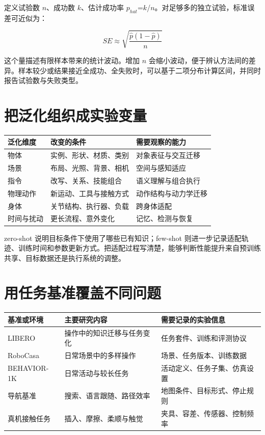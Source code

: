 \documentclass[UTF8,a4paper,11pt,oneside,openany,fontset=none]{ctexbook}
\begin{document}
定义试验数 \(n\)、成功数 \(k\)、估计成功率 \(p_{hat}\)=\(k\)/\(n\)。对足够多的独立试验，标准误差可近似为：

\[
SE\approx\sqrt{\frac{\hat p(1-\hat p)}{n}}
\]

这个量描述有限样本带来的统计波动。增加 \(n\) 会缩小波动，便于辨认方法间的差异。样本较少或结果接近全成功、全失败时，可以基于二项分布计算区间，并同时报告试验数与失败类型。

\section{把泛化组织成实验变量}

{\small %
\begin{longtable}[]{@{}lll@{}}
\toprule\noalign{}
泛化维度 & 改变的条件 & 需要观察的能力 \\
\midrule\noalign{}
\endhead
\bottomrule\noalign{}
\endlastfoot
物体 & 实例、形状、材质、类别 & 对象表征与交互迁移 \\
场景 & 布局、光照、背景、相机 & 空间与感知适应 \\
指令 & 改写、关系、技能组合 & 语义理解与组合执行 \\
物理动作 & 新运动、工具与接触方式 & 动作结构与动力学迁移 \\
身体 & 关节结构、执行器、负载 & 跨身体适配 \\
时间与扰动 & 更长流程、意外变化 & 记忆、检测与恢复 \\
\end{longtable}
}

zero-shot 说明目标条件下使用了哪些已有知识；few-shot 则进一步记录适配轨迹、训练时间和参数更新方式。把适配过程写清楚，能够判断性能提升来自预训练共享、目标数据还是执行系统的调整。

\section{用任务基准覆盖不同问题}

{\small %
\begin{longtable}[]{@{}lll@{}}
\toprule\noalign{}
基准或环境 & 主要研究内容 & 需要记录的实验信息 \\
\midrule\noalign{}
\endhead
\bottomrule\noalign{}
\endlastfoot
LIBERO & 操作中的知识迁移与任务变化 & 任务套件、训练和评测协议 \\
RoboCasa & 日常场景中的多样操作 & 场景、任务版本、训练数据 \\
BEHAVIOR-1K & 日常活动与较长任务 & 活动定义、任务子集、仿真设置 \\
导航基准 & 搜索、语言跟随、路径效率 & 地图条件、目标形式、停止规则 \\
真机接触任务 & 插入、摩擦、柔顺与触觉 & 夹具、容差、传感器、控制频率 \\
\end{longtable}
}
\end{document}
